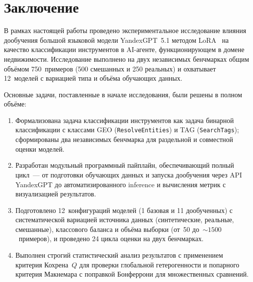 
\section{Заключение} \label{sec:conclusion}

В рамках настоящей работы проведено экспериментальное исследование влияния дообучения большой языковой модели YandexGPT~5.1 методом LoRA~\cite{hu2022lora} на качество классификации инструментов в AI-агенте, функционирующем в домене недвижимости. Исследование выполнено на двух независимых бенчмарках общим объёмом 750~примеров (500 смешанных и 250 реальных) и охватывает 12~моделей с вариацией типа и объёма обучающих данных.

Основные задачи, поставленные в начале исследования, были решены в полном объёме:
\begin{enumerate}
    \item Формализована задача классификации инструментов как задача бинарной классификации с классами GEO (\texttt{ResolveEntities}) и TAG (\texttt{SearchTags}); сформированы два независимых бенчмарка для раздельной и совместной оценки моделей.
    \item Разработан модульный программный пайплайн, обеспечивающий полный цикл~--- от подготовки обучающих данных и запуска дообучения через API YandexGPT до автоматизированного inference и вычисления метрик с визуализацией результатов.
    \item Подготовлено 12~конфигураций моделей (1 базовая и 11 дообученных) с систематической вариацией источника данных (синтетические, реальные, смешанные), классового баланса и объёма выборки (от~50 до~${\sim}1500$~примеров), и проведено 24 цикла оценки на двух бенчмарках.
    \item Выполнен строгий статистический анализ результатов с применением критерия Кохрена~$Q$ для проверки глобальной гетерогенности и попарного критерия Макнемара с поправкой Бонферрони для множественных сравнений.
\end{enumerate}

